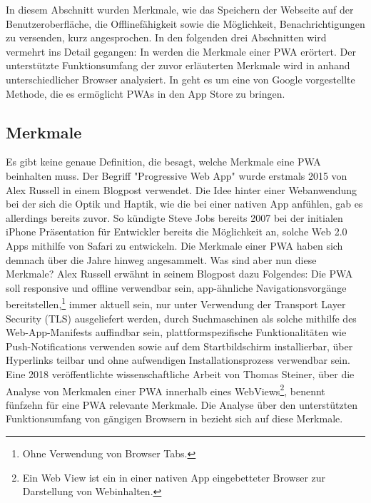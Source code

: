 In diesem Abschnitt wurden Merkmale, wie das Speichern der Webseite auf der Benutzeroberfläche,
die Offlinefähigkeit sowie die Möglichkeit, Benachrichtigungen zu versenden, kurz angesprochen.
In den folgenden drei Abschnitten wird vermehrt ins Detail gegangen: In 
werden die Merkmale einer PWA erörtert. Der unterstützte Funktionsumfang der zuvor erläuterten Merkmale 
wird in  anhand unterschiedlicher Browser 
analysiert. In  geht es um eine von Google vorgestellte Methode,
die es ermöglicht PWAs in den App Store zu bringen.

\subsection{Merkmale}
\label{subsec:markmale}
Es gibt keine genaue Definition, die besagt, welche Merkmale eine PWA beinhalten muss.
Der Begriff "Progressive Web App" wurde erstmals 2015 von Alex Russell in einem Blogpost
verwendet.\cite{PWA2015} Die Idee hinter einer Webanwendung bei der sich die Optik und Haptik,
wie die bei einer nativen App anfühlen, gab es allerdings bereits zuvor. So kündigte
Steve Jobs bereits 2007 bei der initialen iPhone Präsentation für Entwickler bereits die Möglichkeit
an, solche Web 2.0 Apps mithilfe von Safari zu entwickeln.\cite{SteveJobsIphonePresentation}
Die Merkmale einer PWA haben sich demnach über die Jahre hinweg angesammelt. Was sind aber
nun diese Merkmale? Alex Russell erwähnt in seinem Blogpost dazu Folgendes:
Die PWA soll responsive und offline verwendbar sein, app-ähnliche Navigationsvorgänge bereitstellen,\footnote{Ohne Verwendung von Browser Tabs.} 
immer aktuell sein, nur unter Verwendung der Transport Layer Security (TLS) ausgeliefert werden, durch Suchmaschinen als solche mithilfe
des Web-App-Manifests auffindbar sein, plattformspezifische Funktionalitäten wie Push-Notifications
verwenden sowie auf dem Startbildschirm installierbar, über Hyperlinks teilbar und ohne aufwendigen
Installationsprozess verwendbar sein.\cite{PWA2015} Eine 2018 veröffentlichte wissenschaftliche
Arbeit von Thomas Steiner, über die Analyse von Merkmalen einer PWA innerhalb eines WebViews\footnote{Ein Web View ist ein in einer nativen App eingebetteter Browser zur Darstellung von Webinhalten.},
benennt fünfzehn für eine PWA relevante Merkmale. Die Analyse über den unterstützten Funktionsumfang
von gängigen Browsern in 
bezieht sich auf diese Merkmale.\cite{WhatIsInAWebView}

